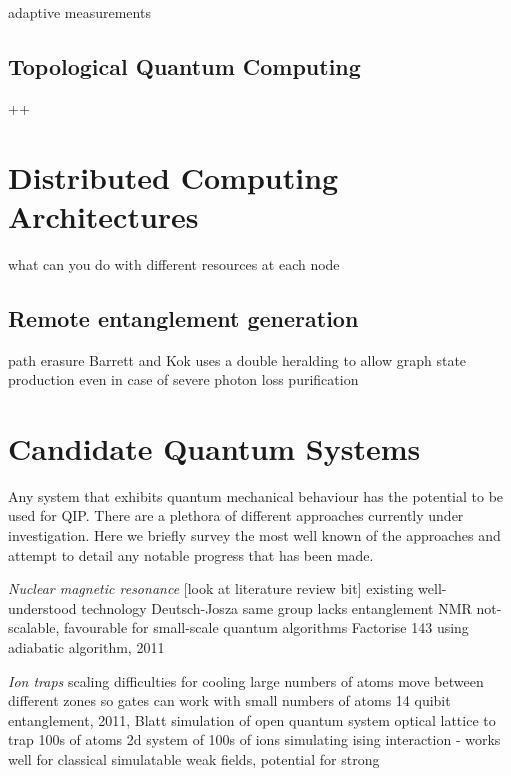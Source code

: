 adaptive measurements


\subsection{Topological Quantum Computing}

++


\section{Distributed Computing Architectures}


what can you do with different resources at each node
\cite{effiecient_distributed_qip_13}

\subsection{Remote entanglement generation}

path erasure \cite{basic_path_erasure} \cite{path_erasure_beam_splitter}
Barrett and Kok \cite{barrett+kok} uses a double heralding to allow graph state production even in case of severe photon loss
purification

\section{Candidate Quantum Systems}

Any system that exhibits quantum mechanical behaviour has the potential to be used for QIP. There are a plethora of different approaches currently under investigation. Here we briefly survey the most well known of the approaches and attempt to detail any notable progress that has been made.

\textit{Nuclear magnetic resonance}
[look at literature review bit]
existing well-understood technology
\cite{nmr_proposal_chuang_97}
\cite{chuang_first_nmr_realisation_98} Deutsch-Josza
\cite{nmr_factorise_15_01} same group
lacks entanglement \cite{nmr_pseudo_pure}
NMR not-scalable, favourable for small-scale quantum algorithms
\cite{nmr_143_factorization} Factorise 143 using adiabatic algorithm, 2011

\textit{Ion traps}
\cite{cirac_zoller_ion_trap_proposal_95}
\cite{first_ion_trap_wineland_98}
scaling difficulties for cooling large numbers of atoms
move between different zones so gates can work with small numbers of atoms
\cite{ion_trap_14_qubits} 14 quibit entanglement, 2011, Blatt
\cite{ion_trap_simulator} simulation of open quantum system
\cite{ion_trap_digital_simulator}
optical lattice to trap 100s of atoms
\cite{ion_trap_magnetism_simulator} 2d system of 100s of ions simulating ising interaction - works well for classical simulatable weak fields, potential for strong

